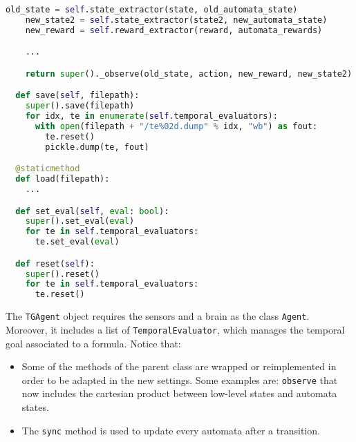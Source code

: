 \begin{lstlisting}[style=Python, language=Python, escapechar=£, label={code:temporalGoalAgent}, caption={\texttt{TGAgent}}]
    old_state = self.state_extractor(state, old_automata_state)
    new_state2 = self.state_extractor(state2, new_automata_state)
    new_reward = self.reward_extractor(reward, automata_rewards)

    ...

    return super()._observe(old_state, action, new_reward, new_state2)

  def save(self, filepath):
    super().save(filepath)
    for idx, te in enumerate(self.temporal_evaluators):
      with open(filepath + "/te%02d.dump" % idx, "wb") as fout:
        te.reset()
        pickle.dump(te, fout)

  @staticmethod
  def load(filepath):
    ...

  def set_eval(self, eval: bool):
    super().set_eval(eval)
    for te in self.temporal_evaluators:
      te.set_eval(eval)

  def reset(self):
    super().reset()
    for te in self.temporal_evaluators:
      te.reset()
\end{lstlisting}
The \texttt{TGAgent} object requires the sensors and a brain as the class \texttt{Agent}. Moreover, it includes a list of \texttt{TemporalEvaluator}, which manages the temporal goal associated to a formula.
Notice that:
\begin{itemize}
	\item Some of the methods of the parent class are wrapped or reimplemented in order to be adapted in the new settings. Some examples are: \texttt{observe} that now includes the cartesian product between low-level states and automata states.
	\item The \texttt{sync} method is used to update every automata after a transition.
\end{itemize}

